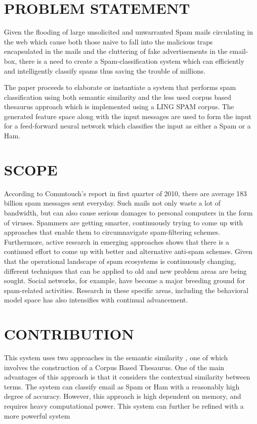 \section{PROBLEM STATEMENT}

Given the flooding of large unsolicited and unwarranted Spam mails circulating in the web which cause both those naive to fall into the malicious traps encapsulated in the mails and the cluttering of fake advertisements in the email-box, there is a need to create a Spam-classification system which can efficiently and intelligently classify spams thus saving the trouble of millions.

The paper proceeds to elaborate or instantiate a system that performs spam classification using both semantic similarity and the less used corpus based thesaurus approach which is implemented using a LING SPAM corpus. The generated feature space along with the input messages are used to form the input for a feed-forward neural network which classifies the input as either a Spam or a Ham.  

\section{SCOPE}

According to Commtouch’s report in first quarter of 2010, there are average 183 billion spam messages sent everyday. Such mails not only waste a lot of bandwidth, but can also cause serious damages to personal computers in the form of viruses. Spammers are getting smarter, continuously trying to come up with approaches that enable them to circumnavigate spam-filtering schemes. Furthermore, active research in emerging approaches shows that there is a continued effort to come up with better and alternative anti-spam schemes. Given that the operational landscape of spam ecosystems is continuously changing, different techniques that can be applied to old and new problem areas are being sought. Social networks, for example, have become a major breeding ground for spam-related activities. Research in these specific areas, including the behavioral model space has also intensifies with continual advancement.

\section{CONTRIBUTION}

This system uses two approaches in the semantic similarity , one of which involves the construction of a Corpus Based Thesaurus. One of the main advantages of this approach is that it  considers the contextual similarity between terms. The system can classify email as Spam or Ham with a reasonably high degree of accuracy. However, this approach is high dependent on memory, and requires heavy computational power. This system can further be refined with a more powerful system

